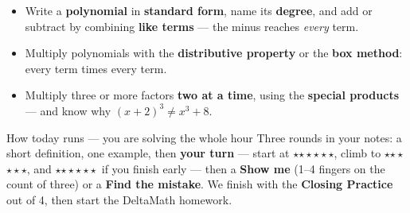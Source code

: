 \documentclass[aspectratio=169, 11pt]{beamer}
\newcommand{\rung}[1]{{\color{goldacc}\ifcase#1\or$\star$\or$\star\star$\or$\star\star\star$\fi}}
\begin{document}
\begin{frame}[t, plain]
  \begin{itemize}\setlength{\itemsep}{4pt}
    \item Write a \textbf{polynomial} in \textbf{standard form}, name its \textbf{degree}, and add
          or subtract by combining \textbf{like terms} --- the minus reaches \emph{every} term.
    \item Multiply polynomials with the \textbf{distributive property} or the \textbf{box
          method}: every term times every term.
    \item Multiply three or more factors \textbf{two at a time}, using the \textbf{special
          products} --- and know why $(x+2)^3\ne x^3+8$.
  \end{itemize}
  \vspace{3pt}
  \begin{block}{How today runs --- you are solving the whole hour}
    Three rounds in your notes: a short definition, one example, then \textbf{your turn} ---
    start at \rung1, climb to \rung2, and \rung3\ if you finish early --- then a \textbf{Show me}
    (1--4 fingers on the count of three) or a \textbf{Find the mistake}. We finish with the
    \textbf{Closing Practice} out of 4, then start the DeltaMath homework.
  \end{block}
\end{frame}
\end{document}
